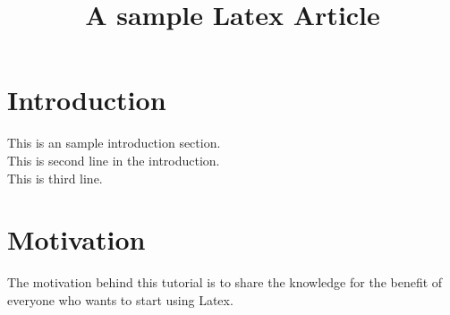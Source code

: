 \documentclass[12pt]{article}
\begin{document}
\title{A sample Latex Article}
\maketitle

\section{Introduction}
This is an sample introduction section.\\
This is second line in the introduction.\\
This is third line.

\section{Motivation}
The motivation behind this tutorial is to share the knowledge for the benefit of everyone who wants to start using Latex.


	
\end{document}
